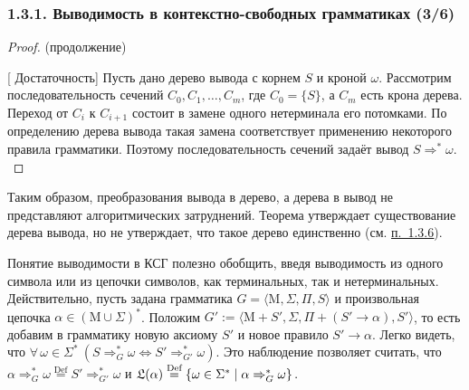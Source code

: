 \documentclass[mathserif,12pt,aspectratio=169]{beamer}
\def\Set#1#2{\left\{ #1 \mid #2 \right\}}
\let\Equiv\Longleftrightarrow
\def\Assign{\operatorname{:=}}
\def\Def{\stackrel{\text{Def}}{=}}
\def\A#1#2{\forall\,#1\ \left(#2\right)}
\def\proofsection#1{\par{\color{brown}\sffamily\small  [\;}{\sffamily\small\color{brown} #1}{\sffamily\small\color{brown}\;]}\;}
\def\DMref#1#2{{\color{blue}\underline{\hyperlink{#2}{#1}}}}
\begin{document}
\begin{frame}
\frametitle{1.3.1. Выводимость в контекстно-свободных грамматиках (3/6)}
\begin{proof} (продолжение)
\proofsection{Достаточность}
Пусть дано дерево вывода с корнем $S$ и кроной $\omega$.
Рассмотрим последовательность сечений $C_0, C_1, \dots, C_m$,
где $C_0=\{S\}$, а $C_m$ есть крона дерева.
Переход от $C_i$ к $C_{i+1}$ состоит в замене одного нетерминала
его потомками.
По определению дерева вывода такая замена соответствует применению
некоторого правила грамматики.
Поэтому последовательность сечений задаёт вывод
$
S \Rightarrow^* \omega.
$
\end{proof}

\begin{remark} 
Таким образом,  преобразования вывода в дерево, а дерева в вывод не 
представляют алгоритмических затруднений.
Теорема утверждает существование дерева вывода,
но не утверждает, что такое дерево единственно
(см. \DMref{п.~1.3.6}{1.3.6.}).
\end{remark}

\smallskip
Понятие выводимости в КСГ полезно обобщить, введя выводимость     
из одного символа или из цепочки символов, как терминальных, так и нетерминальных.
Действительно, пусть
задана грамматика $G=\langle \mathrm{M}, \Sigma, \Pi, S \rangle$ и
произвольная цепочка $\alpha \in (\mathrm{M}\cup\Sigma)^*$.
Положим $G' \Assign \langle \mathrm{M}+S', \Sigma, \Pi+(S'\to\alpha), S' \rangle$,
то есть добавим в грамматику новую аксиому $S'$
и новое правило $S' \to\alpha$. Легко видеть, что
$\A{\omega\in\Sigma^*}{S\Rightarrow^*_G \omega \Equiv S'\Rightarrow^*_{G'} \omega}$. 
Это наблюдение позволяет считать, что
$ \alpha\Rightarrow^*_G \omega \Def S'\Rightarrow^*_{G'} \omega$ 
и
$\frak{L}(\alpha)\Def\Set{\omega\in\Sigma^*}{\alpha\Rightarrow^*_G \omega}
.$
\end{frame}
\end{document}
